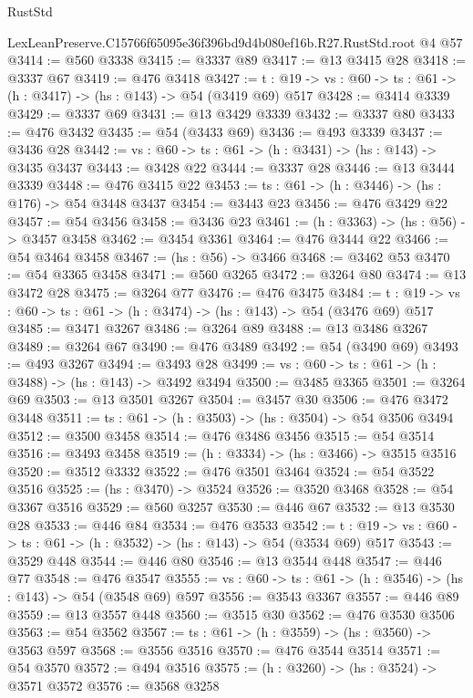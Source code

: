 \begin{lexlean}{RustStd}
\begin{coremodule}
  LexLeanPreserve.C15766f65095e36f396bd9d4b080ef16b.R27.RustStd.root @4 @57
@3414 := @560 @3338
@3415 := @3337 @89
@3417 := @13 @3415 @28
@3418 := @3337 @67
@3419 := @476 @3418
@3427 := {t : @19} -> {vs : @60} -> {ts : @61} -> (h : @3417) -> (hs : @143) -> @54 (@3419 @69) @517
@3428 := @3414 @3339
@3429 := @3337 @69
@3431 := @13 @3429 @3339
@3432 := @3337 @80
@3433 := @476 @3432
@3435 := @54 (@3433 @69)
@3436 := @493 @3339
@3437 := @3436 @28
@3442 := {vs : @60} -> {ts : @61} -> (h : @3431) -> (hs : @143) -> @3435 @3437
@3443 := @3428 @22
@3444 := @3337 @28
@3446 := @13 @3444 @3339
@3448 := @476 @3415 @22
@3453 := {ts : @61} -> (h : @3446) -> (hs : @176) -> @54 @3448 @3437
@3454 := @3443 @23
@3456 := @476 @3429 @22
@3457 := @54 @3456
@3458 := @3436 @23
@3461 := (h : @3363) -> (hs : @56) -> @3457 @3458
@3462 := @3454 @3361
@3464 := @476 @3444 @22
@3466 := @54 @3464 @3458
@3467 := (hs : @56) -> @3466
@3468 := @3462 @53
@3470 := @54 @3365 @3458
@3471 := @560 @3265
@3472 := @3264 @80
@3474 := @13 @3472 @28
@3475 := @3264 @77
@3476 := @476 @3475
@3484 := {t : @19} -> {vs : @60} -> {ts : @61} -> (h : @3474) -> (hs : @143) -> @54 (@3476 @69) @517
@3485 := @3471 @3267
@3486 := @3264 @89
@3488 := @13 @3486 @3267
@3489 := @3264 @67
@3490 := @476 @3489
@3492 := @54 (@3490 @69)
@3493 := @493 @3267
@3494 := @3493 @28
@3499 := {vs : @60} -> {ts : @61} -> (h : @3488) -> (hs : @143) -> @3492 @3494
@3500 := @3485 @3365
@3501 := @3264 @69
@3503 := @13 @3501 @3267
@3504 := @3457 @30
@3506 := @476 @3472 @3448
@3511 := {ts : @61} -> (h : @3503) -> (hs : @3504) -> @54 @3506 @3494
@3512 := @3500 @3458
@3514 := @476 @3486 @3456
@3515 := @54 @3514
@3516 := @3493 @3458
@3519 := (h : @3334) -> (hs : @3466) -> @3515 @3516
@3520 := @3512 @3332
@3522 := @476 @3501 @3464
@3524 := @54 @3522 @3516
@3525 := (hs : @3470) -> @3524
@3526 := @3520 @3468
@3528 := @54 @3367 @3516
@3529 := @560 @3257
@3530 := @446 @67
@3532 := @13 @3530 @28
@3533 := @446 @84
@3534 := @476 @3533
@3542 := {t : @19} -> {vs : @60} -> {ts : @61} -> (h : @3532) -> (hs : @143) -> @54 (@3534 @69) @517
@3543 := @3529 @448
@3544 := @446 @80
@3546 := @13 @3544 @448
@3547 := @446 @77
@3548 := @476 @3547
@3555 := {vs : @60} -> {ts : @61} -> (h : @3546) -> (hs : @143) -> @54 (@3548 @69) @597
@3556 := @3543 @3367
@3557 := @446 @89
@3559 := @13 @3557 @448
@3560 := @3515 @30
@3562 := @476 @3530 @3506
@3563 := @54 @3562
@3567 := {ts : @61} -> (h : @3559) -> (hs : @3560) -> @3563 @597
@3568 := @3556 @3516
@3570 := @476 @3544 @3514
@3571 := @54 @3570
@3572 := @494 @3516
@3575 := (h : @3260) -> (hs : @3524) -> @3571 @3572
@3576 := @3568 @3258

\end{coremodule}
\end{lexlean}
